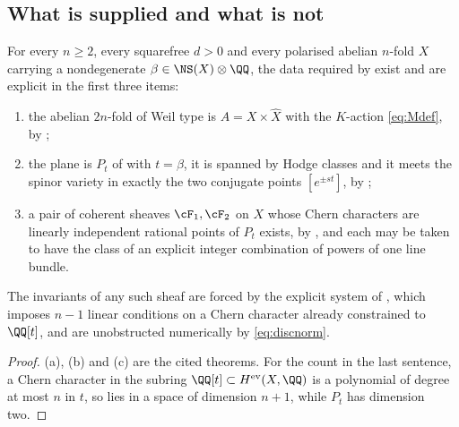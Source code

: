 \subsection{What is supplied and what is not}

\begin{theorem}\label{thm:twoofthefour}
For every $n\ge2$, every squarefree $d>0$ and every polarised abelian $n$-fold
$X$ carrying a nondegenerate $\beta\in\NS(X)\otimes\QQ$, the data required by
 exist and are explicit in the first three items:
\begin{enumerate}[label=\textup{(\alph*)}]
\item the abelian $2n$-fold of Weil type is $A=X\times\widehat{X}$ with the
  $K$-action \eqref{eq:Mdef}, by ;
\item the plane is $P_{t}$ of  with $t=\beta$, it is
  spanned by Hodge classes and it meets the spinor variety in exactly the two
  conjugate points $[e^{\pm st}]$, by ;
\item a pair of coherent sheaves $\cF_{1},\cF_{2}$ on $X$ whose Chern
  characters are linearly independent rational points of $P_{t}$ exists, by
  , and each may be taken to have the class of an
  explicit integer combination of powers of one line bundle.
\end{enumerate}
The invariants of any such sheaf are forced by the explicit system of
, which imposes $n-1$ linear conditions on a Chern
character already constrained to $\QQ[t]$, and are unobstructed numerically by
\eqref{eq:discnorm}.
\end{theorem}

\begin{proof}
(a), (b) and (c) are the cited theorems. For the count in the last sentence, a
Chern character in the subring $\QQ[t]\subset H^{\mathrm{ev}}(X,\QQ)$ is a
polynomial of degree at most $n$ in $t$, so lies in a space of dimension
$n+1$, while $P_{t}$ has dimension two.
\end{proof}

